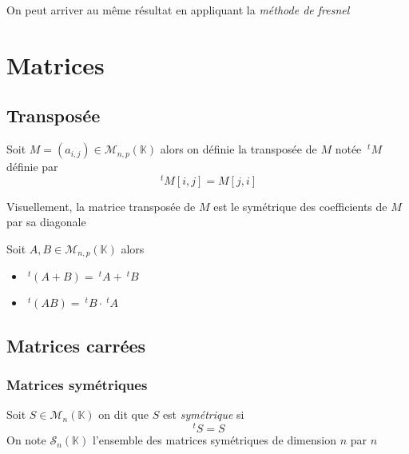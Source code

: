 \documentclass[11pt,colorlinks]{book}
\theoremstyle{mytheoremstyle}
\theoremstyle{mytheoremstyle}
\theoremstyle{mytheoremstyle}
\theoremstyle{mytheoremstyle}
\theoremstyle{mytheoremstyle}
\theoremstyle{mytheoremstyle}
\theoremstyle{mytheoremstyle}
\theoremstyle{mytheoremstyle}
\theoremstyle{myproblemstyle}
\def\mbb#1{\mathbb{#1}}
\def\bK{\mbb{K}}
\begin{document}
\begin{rmq}
  On peut arriver au même résultat en appliquant la \textit{méthode de fresnel}
\end{rmq}

\chapter{Matrices}
\section{Transposée}
\begin{definition}
  Soit $M = (a_{i,j}) \in \mathcal{M}_{n,p}(\bK)$ alors on définie la transposée de $M$ notée $~^{t}M$ définie par
  \begin{equation*}
    ~^{t}M[i,j] = M[j,i]
  \end{equation*}
\end{definition}
\begin{rmq}
  Visuellement, la matrice transposée de $M$ est le symétrique des coefficients de $M$ par sa diagonale
\end{rmq}
\begin{prop}[Propriétés]
  Soit $A,B \in \mathcal M_{n,p}(\bK)$ alors 
  \begin{itemize}
    \item $~^{t}(A+B) = ~^{t}A + ~^{t}B$
    \item $~^{t}(AB) = ~^{t}B \cdot ~^{t}A$
  \end{itemize}
\end{prop}
\section{Matrices carrées}
\subsection{Matrices symétriques}
\begin{definition}
  Soit $S \in \mathcal{M}_n(\bK)$ on dit que $S$ est \textit{symétrique} si 
  \begin{equation*}
    ~^{t}S = S
  \end{equation*}
  On note $\mathcal S_n(\bK)$ l'ensemble des matrices symétriques de dimension $n$ par $n$
\end{definition}
\end{document}
